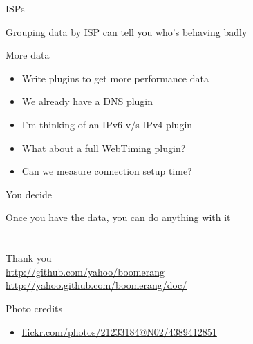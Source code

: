 \documentclass{beamer}
\begin{document}
\begin{frame}{ISPs}
  \begin{center}
  Grouping data by ISP can tell you who's behaving badly
  \end{center}
\end{frame}

\begin{frame}{More data}
  \begin{itemize}
  \item Write plugins to get more performance data
  \item We already have a DNS plugin
  \item I'm thinking of an IPv6 v/s IPv4 plugin
  \item What about a full WebTiming plugin?
  \item Can we measure connection setup time?
  \end{itemize}
\end{frame}

\begin{frame}{You decide}
  \begin{center}
  Once you have the data, you can do anything with it
  \end{center}
\end{frame}

\section{}

\begin{frame}{}
  \begin{center}
  Thank you \\
  \tiny{
  \href{http://www.github.com/yahoo/boomerang/}{http://github.com/yahoo/boomerang} \\
  \href{http://yahoo.github.com/boomerang/doc/}{http://yahoo.github.com/boomerang/doc/}
  }
  \end{center}
\end{frame}

\begin{frame}{Photo credits}
  \begin{itemize}
  \item \href{http://www.flickr.com/photos/21233184@N02/4389412851/}{flickr.com/photos/21233184@N02/4389412851}
  \end{itemize}
\end{frame}
\end{document}
